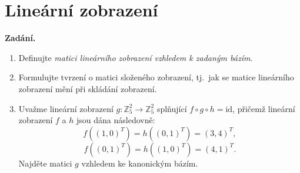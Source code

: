 \section{Lineární zobrazení}

\noindent\textbf{Zadání.}\par
\begin{enumerate}
  \item Definujte \textit{matici lineárního zobrazení vzhledem k zadaným bázím}.
  \item Formulujte tvrzení o matici složeného zobrazení, tj.\ jak se matice lineárního zobrazení mění při skládání zobrazení.
  \item Uvažme lineární zobrazení $g : \mathbb{Z}_5^2 \to \mathbb{Z}_5^2$ splňující $f \circ g \circ h = \mathrm{id}$, přičemž lineární zobrazení $f$ a $h$ jsou dána následovně:
    \[
      f((1,0)^T) = h((0,1)^T) = (3,4)^T,
    \]
    \[
      f((0,1)^T) = h((1,0)^T) = (4,1)^T.
    \]
    Najděte matici $g$ vzhledem ke kanonickým bázím.
\end{enumerate}

